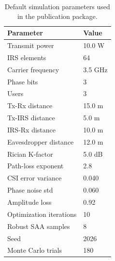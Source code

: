 \begin{table}[t]
\caption{Default simulation parameters used in the publication package.}
\label{tab:setup}
\centering
\begin{tabular}{ll}
\hline
Parameter & Value \\
\hline
Transmit power & 10.0 W \\
IRS elements & 64 \\
Carrier frequency & 3.5 GHz \\
Phase bits & 3 \\
Users & 3 \\
Tx-Rx distance & 15.0 m \\
Tx-IRS distance & 5.0 m \\
IRS-Rx distance & 10.0 m \\
Eavesdropper distance & 12.0 m \\
Rician K-factor & 5.0 dB \\
Path-loss exponent & 2.8 \\
CSI error variance & 0.040 \\
Phase noise std & 0.060 \\
Amplitude loss & 0.92 \\
Optimization iterations & 10 \\
Robust SAA samples & 8 \\
Seed & 2026 \\
Monte Carlo trials & 180 \\
\hline
\end{tabular}
\end{table}
